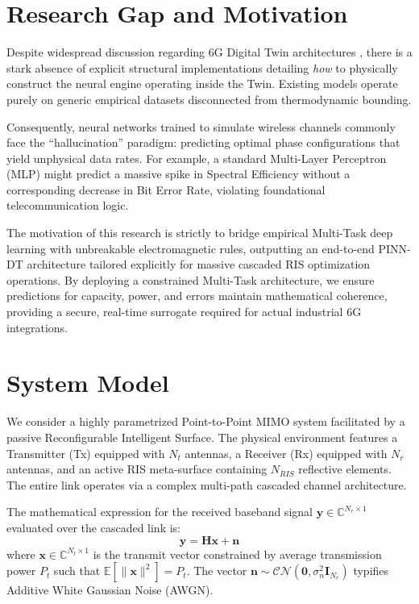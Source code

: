 \documentclass[conference]{IEEEtran}
\begin{document}
\section{Research Gap and Motivation}

Despite widespread discussion regarding 6G Digital Twin architectures \cite{dt_aided2022}\cite{integrated2023}, there is a stark absence of explicit structural implementations detailing \textit{how} to physically construct the neural engine operating inside the Twin. Existing models operate purely on generic empirical datasets disconnected from thermodynamic bounding.

Consequently, neural networks trained to simulate wireless channels commonly face the ``hallucination'' paradigm: predicting optimal phase configurations that yield unphysical data rates. For example, a standard Multi-Layer Perceptron (MLP) might predict a massive spike in Spectral Efficiency without a corresponding decrease in Bit Error Rate, violating foundational telecommunication logic.

The motivation of this research is strictly to bridge empirical Multi-Task deep learning with unbreakable electromagnetic rules, outputting an end-to-end PINN-DT architecture tailored explicitly for massive cascaded RIS optimization operations. By deploying a constrained Multi-Task architecture, we ensure predictions for capacity, power, and errors maintain mathematical coherence, providing a secure, real-time surrogate required for actual industrial 6G integrations.

\section{System Model}

We consider a highly parametrized Point-to-Point MIMO system facilitated by a passive Reconfigurable Intelligent Surface. The physical environment features a Transmitter (Tx) equipped with $N_t$ antennas, a Receiver (Rx) equipped with $N_r$ antennas, and an active RIS meta-surface containing $N_{RIS}$ reflective elements. The entire link operates via a complex multi-path cascaded channel architecture.

The mathematical expression for the received baseband signal $\mathbf{y} \in \mathbb{C}^{N_r \times 1}$ evaluated over the cascaded link is:
\begin{equation} \label{eq:cascade}
\mathbf{y} = \mathbf{H} \mathbf{x} + \mathbf{n}
\end{equation}
where $\mathbf{x} \in \mathbb{C}^{N_t \times 1}$ is the transmit vector constrained by average transmission power $P_t$ such that $\mathbb{E}[\|\mathbf{x}\|^2] = P_t$. The vector $\mathbf{n} \sim \mathcal{CN}(\mathbf{0}, \sigma_n^2 \mathbf{I}_{N_r})$ typifies Additive White Gaussian Noise (AWGN).
\end{document}
